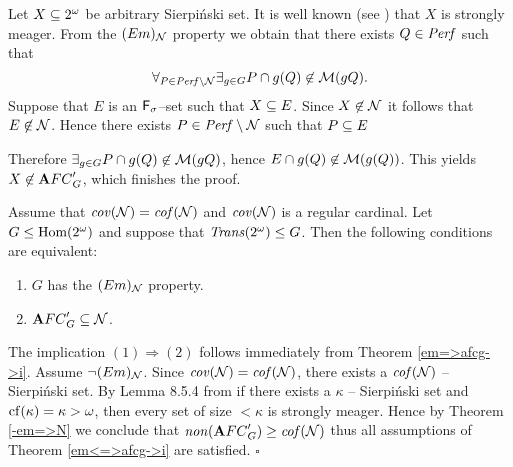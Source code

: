 \proof

  Let $X\subseteq2^{\omega}$ be arbitrary Sierpi\'nski set.
It is well known (see \cite{P}) that $X$ is
strongly meager.
  From the $(Em)_{{\cal N}}$ property we obtain that
there exists $Q \in {\it Perf}$ such that
  \[
    \forall_{P \in {\it Perf} \setminus {\cal N}}
    \exists_{g \in G} P \cap g(Q) \not\in {\cal M}(gQ).
  \]
Suppose that $E$ is an ${\sf F}_{\sigma}$--set such that $X \subseteq E$.
Since $X \not \in {\cal N}$ it follows that $E \not \in {\cal N}$.
  Hence there exists $P \in {\it Perf} \setminus {\cal N} $ such that
$P \subseteq E$

Therefore $\exists_{g \in G} P \cap g(Q) \not\in {\cal M}(gQ)$,
hence $E \cap g(Q) \not\in {\cal M}(g(Q))$.
  This yields $X \not\in {\mathbf AFC}^\prime_{G}$, which finishes the proof.

\begin{corollary}
\label{corollary_1}
  Assume that ${\it cov}({\cal N}) = {\it cof}({\cal N})$ and
${\it cov}({\cal N})$ is a regular cardinal.
  Let $G \leq {\rm Hom(2^{\omega})}$ and suppose that ${\it Trans}(2^{\omega}) \leq G$.
Then the following conditions are equivalent:

  \begin{enumerate}
  \item
    $G$ has the $(Em)_{{\cal N}}$ property.

  \item
    ${\mathbf AFC}^\prime_{G} \subseteq {\cal N}$.

  \end{enumerate}
\end{corollary}

\proof
  The implication $(1) \Rightarrow (2)$ follows immediately
from Theorem \ref{em=>afcg->i}.
  Assume $\neg (Em)_{{\cal N}}$. Since ${\it cov}({\cal N}) = {\it cof}({\cal N})$,
there exists a ${\it cof}({\cal N})$ -- Sierpi\'nski set.
  By Lemma 8.5.4 from \cite{BJ}
if there exists a $\kappa$ -- Sierpi\'nski set
and ${\rm cf}(\kappa) = \kappa > \omega$,
then every set of size $< \kappa$ is strongly meager.
  Hence by Theorem \ref{-em=>N} we conclude that
${\it non}({\mathbf AFC}^\prime_{G}) \geq {\it cof}({\cal N})$
thus all assumptions of Theorem \ref{em<=>afcg->i} are satisfied.
  $\square$


